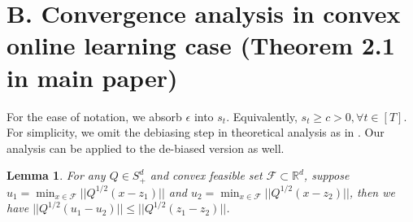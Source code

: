\documentclass{article}
\newtheorem{lemma}[theorem]{Lemma}
\begin{document}
\section*{B. Convergence analysis in convex online learning case (Theorem 2.1 in main paper)}
For the ease of notation, we absorb $\epsilon$ into $s_t$. Equivalently, $s_t \geq c > 0, \forall t \in [T]$. For simplicity, we omit the debiasing step in theoretical analysis as in \cite{reddi2019convergence}. Our analysis can be applied to the de-biased version as well. 
\begin{lemma}{\cite{mcmahan2010adaptive}}
\label{suplemma:1}
For any $Q \in S^d_{+}$ and convex feasible set $\mathcal{F} \subset \mathbb{R}^d$, suppose $u_1 = \operatorname*{min}_{x \in \mathcal{F}} \Big \vert \Big \vert Q^{1/2}(x-z_1) \Big \vert \Big \vert$ and $u_2 = \operatorname*{min}_{x \in \mathcal{F}} \Big \vert \Big \vert Q^{1/2}(x - z_2) \Big \vert \Big \vert$, then we have $ \Big \vert \Big \vert Q^{1/2}(u_1 - u_2)  \Big \vert \Big \vert \leq \Big \vert \Big \vert Q^{1/2} (z_1 - z_2)  \Big \vert \Big \vert$.
\end{lemma}
\end{document}
